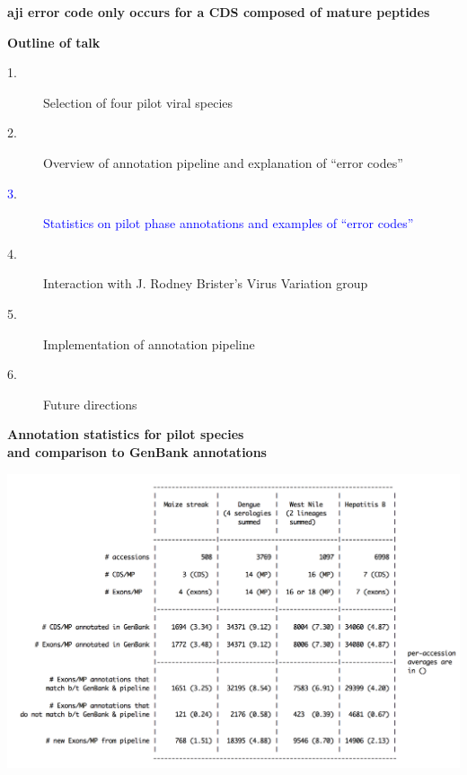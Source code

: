 \documentclass[landscape]{slides}
\begin{document}
\begin{slide}
\begin{center}
\textbf{aji error code only occurs for a CDS composed of mature peptides}
\vspace{0.5in}

\end{center}
\vfill
\end{slide}
\begin{slide}
\begin{center}
\textbf{Outline of talk}

\small
\begin{description}
\item[1.] Selection of four pilot viral species
\item[2.] Overview of annotation pipeline and explanation of ``error codes''
\item[\textcolor{blue}3.] \textcolor{blue}{Statistics on pilot phase annotations and examples of ``error codes''}
\item[4.] Interaction with J. Rodney Brister's Virus Variation group
\item[5.] Implementation of annotation pipeline
\item[6.] Future directions
\end{description}

\end{center}
\vfill
\end{slide}
\begin{slide}
\begin{center}
\textbf{Annotation statistics for pilot species \\ and comparison to
  GenBank annotations}

\includegraphics[width=10in]{figs/pilot-genbank-comparison-table}
\vfill
\end{center}
\end{slide}
\end{document}

